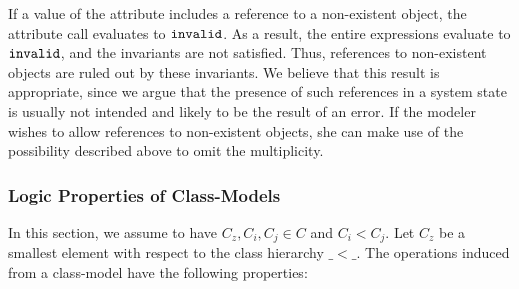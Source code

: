 If a value of the attribute  includes a reference to a non-existent
object, the attribute call evaluates to $\mathtt{invalid}$. As a result, the
entire expressions evaluate to $\mathtt{invalid}$, and the invariants are not
satisfied. Thus, references to non-existent objects are ruled out by these
invariants. We believe that this result is appropriate, since we argue that the
presence of such references in a system state is usually not intended and likely
to be the result of an error. If the modeler wishes to allow references to
non-existent objects, she can make use of the possibility described above to
omit the multiplicity.

\subsubsection{Logic Properties of Class-Models}\label{sec:logicprop-datamodel}
In this section, we assume to have $C_z,C_i,C_j \in C$ and  $C_i < C_j$.
Let $C_z$ be a smallest element with respect to the class hierarchy $\_ < \_$.
The operations induced from a class-model have the following properties:

